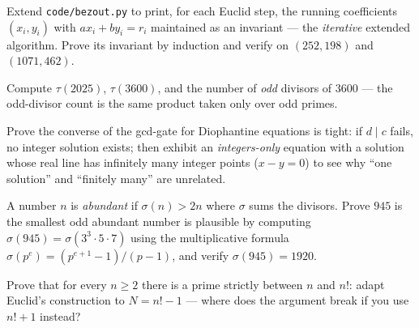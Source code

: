\begin{exercise}[hard]
Extend \texttt{code/bezout.py} to print, for each Euclid step, the running
coefficients $(x_i, y_i)$ with $ax_i + by_i = r_i$ maintained as an
invariant --- the \emph{iterative} extended algorithm. Prove its invariant
by induction and verify on $(252,198)$ and $(1071,462)$.
\end{exercise}
\begin{exercise}[easy]
Compute $\tau(2025)$, $\tau(3600)$, and the number of \emph{odd} divisors
of $3600$ --- the odd-divisor count is the same product taken only over odd
primes.
\end{exercise}
\begin{exercise}[medium]
Prove the converse of the gcd-gate for Diophantine equations is tight: if
$d \mid c$ fails, no integer solution exists; then exhibit an
\emph{integers-only} equation with a solution whose real line has
infinitely many integer points ($x - y = 0$) to see why ``one solution''
and ``finitely many'' are unrelated.
\end{exercise}
\begin{exercise}[medium]
A number $n$ is \emph{abundant} if $\sigma(n) > 2n$ where $\sigma$ sums the
divisors. Prove $945$ is the smallest odd abundant number is plausible by
computing $\sigma(945) = \sigma(3^3\cdot5\cdot7)$ using the multiplicative
formula $\sigma(p^e) = (p^{e+1}-1)/(p-1)$, and verify $\sigma(945) = 1920$.
\end{exercise}
\begin{exercise}[hard]
Prove that for every $n \ge 2$ there is a prime strictly between $n$ and
$n!$: adapt Euclid's construction to $N = n! - 1$ --- where does the
argument break if you use $n! + 1$ instead?
\end{exercise}

